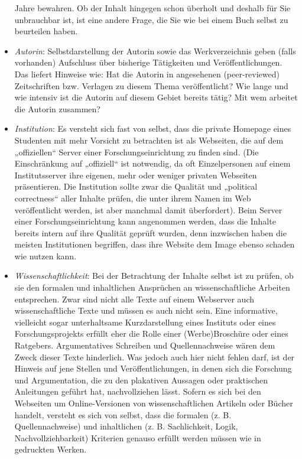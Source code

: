 \documentclass[]{book}
\theoremstyle{definition}
\theoremstyle{definition}
\theoremstyle{definition}
\theoremstyle{remark}
\begin{document}
\begin{itemize}
  Jahre bewahren. Ob der Inhalt hingegen schon überholt und deshalb für
  Sie unbrauchbar ist, ist eine andere Frage, die Sie wie bei einem Buch
  selbst zu beurteilen haben.
\item
  \emph{Autorin}: Selbstdarstellung der Autorin sowie das
  Werkverzeichnis geben (falls vorhanden) Aufschluss über bisherige
  Tätigkeiten und Veröffentlichungen. Das liefert Hinweise wie: Hat die
  Autorin in angesehenen (peer-reviewed) Zeitschriften bzw. Verlagen zu
  diesem Thema veröffentlicht? Wie lange und wie intensiv ist die
  Autorin auf diesem Gebiet bereits tätig? Mit wem arbeitet die Autorin
  zusammen?
\item
  \emph{Institution}: Es versteht sich fast von selbst, dass die private
  Homepage eines Studenten mit mehr Vorsicht zu betrachten ist als
  Webseiten, die auf dem „offiziellen`` Server einer
  Forschungseinrichtung zu finden sind. (Die Einschränkung auf
  „offiziell`` ist notwendig, da oft Einzelpersonen auf einem
  Institutsserver ihre eigenen, mehr oder weniger privaten Webseiten
  präsentieren. Die Institution sollte zwar die Qualität und „political
  correctness`` aller Inhalte prüfen, die unter ihrem Namen im Web
  veröffentlicht werden, ist aber manchmal damit überfordert). Beim
  Server einer Forschungseinrichtung kann angenommen werden, dass die
  Inhalte bereits intern auf ihre Qualität geprüft wurden, denn
  inzwischen haben die meisten Institutionen begriffen, dass ihre
  Website dem Image ebenso schaden wie nutzen kann.
\item
  \emph{Wissenschaftlichkeit}: Bei der Betrachtung der Inhalte selbst
  ist zu prüfen, ob sie den formalen und inhaltlichen Ansprüchen an
  wissenschaftliche Arbeiten entsprechen. Zwar sind nicht alle Texte auf
  einem Webserver auch wissenschaftliche Texte und müssen es auch nicht
  sein. Eine informative, vielleicht sogar unterhaltsame Kurzdarstellung
  eines Instituts oder eines Forschungsprojekts erfüllt eher die Rolle
  einer (Werbe)Broschüre oder eines Ratgebers. Argumentatives Schreiben
  und Quellennachweise wären dem Zweck dieser Texte hinderlich. Was
  jedoch auch hier nicht fehlen darf, ist der Hinweis auf jene Stellen
  und Veröffentlichungen, in denen sich die Forschung und Argumentation,
  die zu den plakativen Aussagen oder praktischen Anleitungen geführt
  hat, nachvollziehen lässt. Sofern es sich bei den Webseiten um
  Online-Versionen von wissenschaftlichen Artikeln oder Bücher handelt,
  versteht es sich von selbst, dass die formalen (z. B.
  Quellennachweise) und inhaltlichen (z. B. Sachlichkeit, Logik,
  Nachvollziehbarkeit) Kriterien genauso erfüllt werden müssen wie in
  gedruckten Werken.
\end{itemize}
\end{document}
